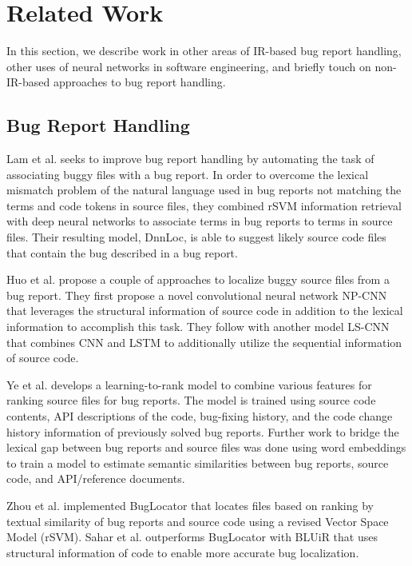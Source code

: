 \section{Related Work}
\label{sec:related word}

In this section, we describe work in other areas of IR-based bug report handling, other uses of neural networks in software engineering, and briefly touch on non-IR-based approaches to bug report handling.

\subsection{Bug Report Handling}

Lam et al. \cite{7372035} seeks to improve bug report handling by automating the task of associating buggy files with a bug report.  In order to overcome the lexical mismatch problem of the natural language used in bug reports not matching the terms and code tokens in source files, they combined rSVM information retrieval with deep neural networks to associate terms in bug reports to terms in source files.  Their resulting model, DnnLoc, is able to suggest likely source code files that contain the bug described in a bug report.

Huo et al. \cite{Huo:2017:EUF:3172077.3172153, Huo:2016:LUF:3060832.3060845} propose a couple of approaches to localize buggy source files from a bug report.  They first propose a novel convolutional neural network NP-CNN that leverages the structural information of source code in addition to the lexical information to accomplish this task.  They follow with another model LS-CNN that combines CNN and LSTM to additionally utilize the sequential information of source code.

Ye et al. \cite{Ye:ICSE16, Ye:FSE14} develops a learning-to-rank model to combine various features for ranking source files for bug reports.  The model is trained using source code contents, API descriptions of the code, bug-fixing history, and the code change history information of previously solved bug reports.  Further work to bridge the lexical gap between bug reports and source files was done using word embeddings to train a model to estimate semantic similarities between bug reports, source code, and API/reference documents.

Zhou et al. \cite{Zhou:2012:BFM:2337223.2337226} implemented BugLocator that locates files based on ranking by textual similarity of bug reports and source code using a revised Vector Space Model (rSVM).  Sahar et al. \cite{Saha:2013:ASE:6693093} outperforms BugLocator with BLUiR that uses structural information of code to enable more accurate bug localization.


